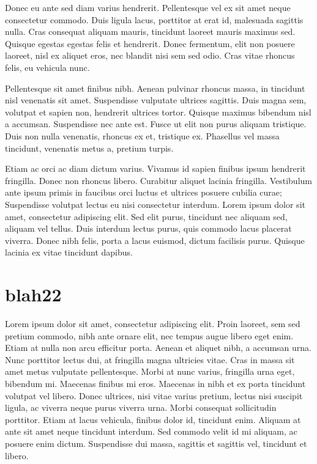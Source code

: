 \documentclass[a4paper, 11pt]{report}
\begin{document}
Donec eu ante sed diam varius hendrerit. Pellentesque vel ex sit amet neque consectetur commodo. Duis ligula lacus, porttitor at erat id, malesuada sagittis nulla. Cras consequat aliquam mauris, tincidunt laoreet mauris maximus sed. Quisque egestas egestas felis et hendrerit. Donec fermentum, elit non posuere laoreet, nisl ex aliquet eros, nec blandit nisi sem sed odio. Cras vitae rhoncus felis, eu vehicula nunc.

Pellentesque sit amet finibus nibh. Aenean pulvinar rhoncus massa, in tincidunt nisl venenatis sit amet. Suspendisse vulputate ultrices sagittis. Duis magna sem, volutpat et sapien non, hendrerit ultrices tortor. Quisque maximus bibendum nisl a accumsan. Suspendisse nec ante est. Fusce ut elit non purus aliquam tristique. Duis non nulla venenatis, rhoncus ex et, tristique ex. Phasellus vel massa tincidunt, venenatis metus a, pretium turpis.

Etiam ac orci ac diam dictum varius. Vivamus id sapien finibus ipsum hendrerit fringilla. Donec non rhoncus libero. Curabitur aliquet lacinia fringilla. Vestibulum ante ipsum primis in faucibus orci luctus et ultrices posuere cubilia curae; Suspendisse volutpat lectus eu nisi consectetur interdum. Lorem ipsum dolor sit amet, consectetur adipiscing elit. Sed elit purus, tincidunt nec aliquam sed, aliquam vel tellus. Duis interdum lectus purus, quis commodo lacus placerat viverra. Donec nibh felis, porta a lacus euismod, dictum facilisis purus. Quisque lacinia ex vitae tincidunt dapibus.

\chapter{blah22}


Lorem ipsum dolor sit amet, consectetur adipiscing elit. Proin laoreet, sem sed pretium commodo, nibh ante ornare elit, nec tempus augue libero eget enim. Etiam at nulla non arcu efficitur porta. Aenean et aliquet nibh, a accumsan urna. Nunc porttitor lectus dui, at fringilla magna ultricies vitae. Cras in massa sit amet metus vulputate pellentesque. Morbi at nunc varius, fringilla urna eget, bibendum mi. Maecenas finibus mi eros. Maecenas in nibh et ex porta tincidunt volutpat vel libero. Donec ultrices, nisi vitae varius pretium, lectus nisi suscipit ligula, ac viverra neque purus viverra urna. Morbi consequat sollicitudin porttitor. Etiam at lacus vehicula, finibus dolor id, tincidunt enim. Aliquam at ante sit amet neque tincidunt interdum. Sed commodo velit id mi aliquam, ac posuere enim dictum. Suspendisse dui massa, sagittis et sagittis vel, tincidunt et libero.
\end{document}
